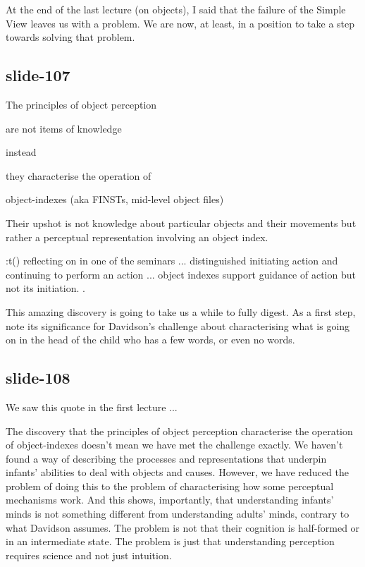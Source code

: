 \documentclass[12pt,\papersize]{extarticle}
\begin{document}
At the end of the last lecture (on objects), I said that the failure of the Simple View 
leaves us with a problem.
We are now, at least, in a position to take a step towards solving that problem.
 
\subsection{slide-107}
The principles of object perception


            
are not items of knowledge 


            
instead 


            
they characterise the operation of 


            
object-indexes (aka FINSTs, mid-level object files)

Their upshot is not knowledge about particular objects and their movements but rather a 
perceptual representation involving an object index.
 
:t()
            reflecting on \citet{mccurry:2009_beyond} in one of the seminars ... distinguished
            initiating action and continuing to perform an action ... object indexes support
            guidance of action but not its initiation.
\citep{Leslie:1998zk,Scholl:1999mi,Carey:2001ue}.
 
This amazing discovery is going to take us a while to fully digest.  As a first step, note its
significance for Davidson's challenge about characterising what is going on in the head of the 
child who has a few words, or even no words.
 
\subsection{slide-108}
We saw this quote in the first lecture ...
 
The discovery that the principles of object perception characterise the operation of 
object-indexes doesn't mean we have met the challenge exactly.
We haven't found a way of describing the processes and representations that underpin infants'
abilities to deal with objects and causes.
However, we have reduced the problem of doing this to the problem of characterising how 
some perceptual mechanisms work.  
And this shows, importantly, that understanding infants' minds is not something different from
understanding adults' minds, contrary to what Davidson assumes.
The problem is not that their cognition is half-formed or in an intermediate state.
The problem is just that understanding perception requires science and not just intuition.
 
\end{document}
